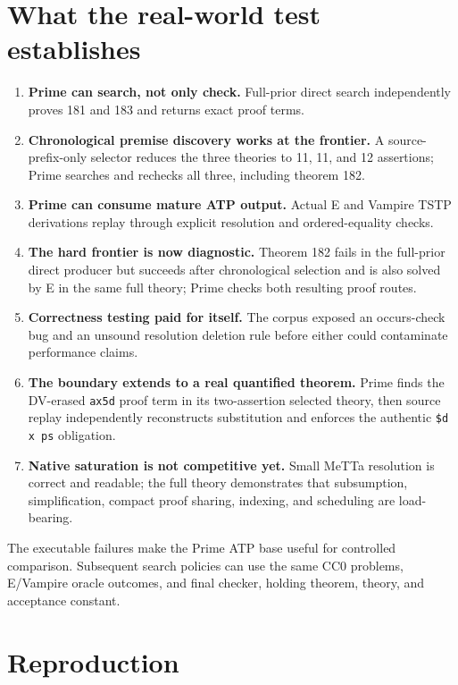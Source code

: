 \documentclass[10pt]{article}
\begin{document}
\section{What the real-world test establishes}

\begin{enumerate}
\item \textbf{Prime can search, not only check.}  Full-prior direct
  search independently proves 181 and 183 and returns exact proof terms.
\item \textbf{Chronological premise discovery works at the frontier.}  A
  source-prefix-only selector reduces the three theories to 11, 11, and 12
  assertions; Prime searches and rechecks all three, including theorem 182.
\item \textbf{Prime can consume mature ATP output.}  Actual E and Vampire TSTP
  derivations replay through explicit resolution and ordered-equality checks.
\item \textbf{The hard frontier is now diagnostic.}  Theorem 182 fails in the
  full-prior direct producer but succeeds after chronological selection and is
  also solved by E in the same full theory; Prime checks both resulting proof
  routes.
\item \textbf{Correctness testing paid for itself.}  The corpus exposed an
  occurs-check bug and an unsound resolution deletion rule before either could
  contaminate performance claims.
\item \textbf{The boundary extends to a real quantified theorem.}  Prime finds
  the DV-erased \texttt{ax5d} proof term in its two-assertion selected theory,
  then source replay independently
  reconstructs substitution and enforces the authentic \texttt{\$d x ps}
  obligation.
\item \textbf{Native saturation is not competitive yet.}  Small MeTTa
  resolution is correct and readable; the full theory demonstrates that
  subsumption, simplification, compact proof sharing, indexing, and scheduling
  are load-bearing.
\end{enumerate}

The executable failures make the Prime ATP base useful for controlled
comparison.  Subsequent search policies can use the same CC0 problems,
E/Vampire oracle outcomes, and final checker, holding theorem, theory, and
acceptance constant.

\section{Reproduction}
\end{document}
